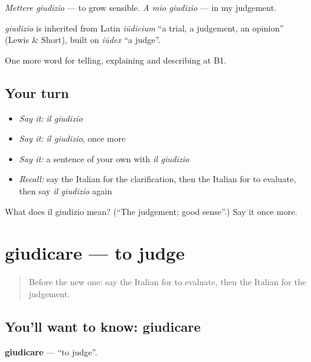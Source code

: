 \emph{Mettere giudizio} — to grow sensible. \emph{A mio giudizio} — in my judgement.

\begin{cousinweb}
\emph{giudizio} is inherited from Latin \emph{iūdicium} \textquotedblleft{}a trial, a judgement, an opinion\textquotedblright{} (Lewis \& Short), built on \emph{iūdex} \textquotedblleft{}a judge\textquotedblright{}.
\end{cousinweb}

\begin{grammarlens}[title={What you've built}]
One more word for telling, explaining and describing at B1.
\end{grammarlens}

\subsection*{Your turn}
\begin{itemize}
\raggedright
  \item \emph{Say it:} \emph{il giudizio}
  \item \emph{Say it:} \emph{il giudizio}, once more
  \item \emph{Say it:} a sentence of your own with \emph{il giudizio}
  \item \emph{Recall:} say the Italian for the clarification, then the Italian for to evaluate, then say \emph{il giudizio} again
\end{itemize}

\begin{tcolorbox}[breakable,colback=teal!4,colframe=teal!35!black,title={Before you move on}]
What does il giudizio mean? (\textquotedblleft{}The judgement; good sense\textquotedblright{}.) Say it once more.
\end{tcolorbox}
\section[giudicare]{giudicare — to judge}

\label{lesson:IT-C347-giudicare}



\begin{quote}
Before the new one: say the Italian for to evaluate, then the Italian for the judgement.
\end{quote}

\subsection*{You'll want to know: giudicare}
\textbf{giudicare} — \textquotedblleft{}to judge\textquotedblright{}.


